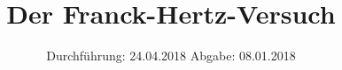 
\usepackage{wrapfig}
\usepackage{ dsfont }
\subject{VERSUCH 601}
\title{Der Franck-Hertz-Versuch}
\date{%
  \hspace{-2.5em}
  Durchführung: 24.04.2018
  \hspace{4em}
  Abgabe: 08.01.2018
}


  \setlength{\parindent}{0em}
  \maketitle
  \thispagestyle{empty}
  \newpage
  \tableofcontents
  \newpage





\printbibliography{}
% 



